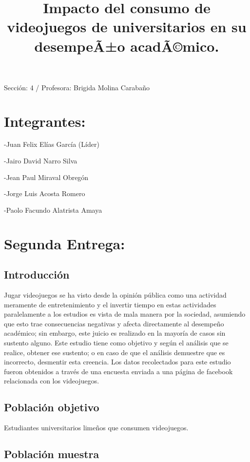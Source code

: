 \documentclass[]{article}
\title{Impacto del consumo de videojuegos de universitarios en su desempeÃ±o
acadÃ©mico.}
\author{}
\date{}
\begin{document}
\maketitle

Sección: 4 / Profesora: Brigida Molina Carabaño

\section{Integrantes:}\label{integrantes}

-Juan Felix Elías García (Líder)

-Jairo David Narro Silva

-Jean Paul Miraval Obregón

-Jorge Luis Acosta Romero

-Paolo Facundo Alatrista Amaya

\section{Segunda Entrega:}\label{segunda-entrega}

\subsection{Introducción}\label{introduccion}

Jugar videojuegos se ha visto desde la opinión pública como una
actividad meramente de entretenimiento y el invertir tiempo en estas
actividades paralelamente a los estudios es vista de mala manera por la
sociedad, asumiendo que esto trae consecuencias negativas y afecta
directamente al desempeño académico; sin embargo, este juicio es
realizado en la mayoría de casos sin sustento alguno. Este estudio tiene
como objetivo y según el análisis que se realice, obtener ese sustento;
o en caso de que el análisis demuestre que es incorrecto, desmentir esta
creencia. Los datos recolectados para este estudio fueron obtenidos a
través de una encuesta enviada a una página de facebook relacionada con
los videojuegos.

\subsection{Población objetivo}\label{poblacion-objetivo}

Estudiantes universitarios limeños que consumen videojuegos.

\subsection{Población muestra}\label{poblacion-muestra}
\end{document}
